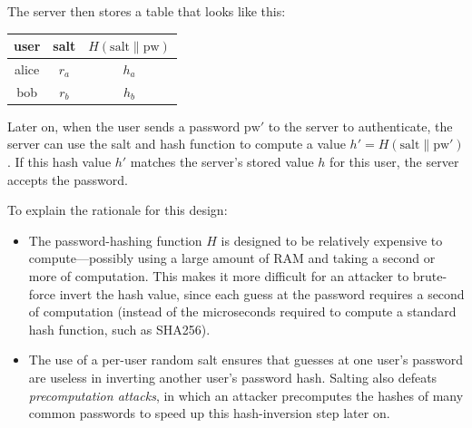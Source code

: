 The server then stores a table that looks like this:

\medskip
\begin{tabular}{c|c|c}
  user & salt & $H(\text{salt}\|\text{pw})$ \\
	\hline
	alice & $r_a$ & $h_a$ \\
	bob & $r_b$ & $h_b$ \\
\end{tabular}
\medskip

Later on, when the user sends a password $\text{pw}'$ to the server to authenticate, 
the server can use the salt and hash function to compute a value $h' = H(\text{salt}\|\text{pw}')$.
If this hash value $h'$ matches the server's stored value $h$ for this user,
the server accepts the password.

To explain the rationale for this design:
\begin{itemize}
  \item The password-hashing function $H$ is designed to be relatively expensive
        to compute---possibly using a large amount of RAM and taking a second or 
        more of computation.
        This makes it more difficult for an attacker to brute-force invert the
        hash value, since each guess at the password requires a second of computation
        (instead of the microseconds required to compute a standard hash function,
        such as SHA256).
  \item The use of a per-user random salt ensures that guesses at one user's password
    are useless in inverting another user's password hash.
        Salting also defeats \emph{precomputation attacks}, in which an attacker
        precomputes the hashes of many common passwords to speed up this hash-inversion
        step later on.
\end{itemize}

